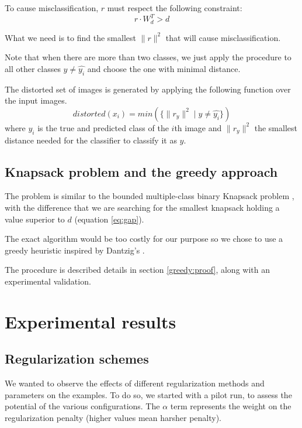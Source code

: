 \documentclass{article} %
\begin{document}
To cause misclassification, $r$ must respect the following constraint:
\begin{equation}
\label{eq:noise_threshold}
  r \cdot W_d^T > d
\end{equation}

What we need is to find the smallest $ \lVert{r} \rVert^2$ that will cause
misclassification. 

Note that when there are more than two classes, we just
apply the procedure to all other classes $y \neq \widehat{y_i}$ and choose the one with minimal distance.

The distorted set of images is generated by applying the following function over
the input images.
\begin{equation}
	\label{robustness}
	distorted(x_i) = min(\{\lVert{r_{y}} \rVert^2 \mid y \neq \widehat{y_i}\})
\end{equation}
where $\widehat{y_i}$ is the true and predicted class of the $i$th image and $\lVert{r_{y}} \rVert^2$ the smallest distance needed for the classifier to classify it as $y$.


\subsection{Knapsack problem and the greedy approach}

The problem is similar to the bounded multiple-class binary Knapsack problem
\citep{vanderbeck_extending_2002}, with the difference that we are searching
for the smallest knapsack holding a value superior to $d$ (equation
\ref{eq:gap}).

The exact algorithm would be too costly for our purpose so we chose to use a
greedy heuristic inspired by Dantzig's \citep{dantzig_discrete-variable_1957}.

The procedure is described details in section \ref{greedy:proof}, along with
an experimental validation.


\section{Experimental results}


\subsection{Regularization schemes}

We wanted to observe the effects of different regularization methods and parameters on the examples. To do so, we started with
a pilot run, to assess the potential of the various configurations. 
The $\alpha$ term represents the weight on the regularization penalty (higher values mean harsher penalty).
\end{document}
